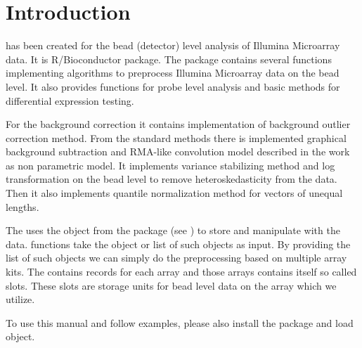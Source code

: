 \section{Introduction}
 has been created for the bead (detector) level analysis of Illumina Microarray data. It is R/Bioconductor package.  The package  contains several functions implementing algorithms to preprocess Illumina Microarray data on the bead level. It also provides functions for probe level analysis and basic methods for differential expression testing.

For the background correction it contains implementation of background outlier correction method. From the standard methods there is implemented graphical background subtraction and RMA-like convolution model described in the work \cite{xie_statistical_2009} as non parametric model. It implements variance stabilizing method and log transformation on the bead level to remove heteroskedasticity from the data. Then it also implements quantile normalization method for vectors of unequal lengths.

The  uses the object  from the package  (see \cite{dunning_beadarray:_2007}) to store and manipulate with the data.  functions take the  object or list of such objects as input. By providing the list of such objects we can simply do the preprocessing based on multiple array kits. The  contains records for each array and those arrays contains itself so called slots. These slots are storage units for bead level data on the array which we utilize.

To use this manual and follow examples, please also install the package  and load  object.


